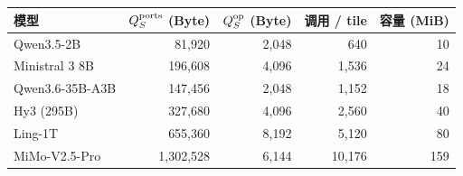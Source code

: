 \begin{tabular}{@{}lrrrr@{}}\toprule
模型 & $Q_S^{\rm ports}$ (Byte) & $Q_S^{\rm op}$ (Byte) & 调用 / tile & 容量 (MiB)\\\midrule
Qwen3.5-2B & 81,920 & 2,048 & 640 & 10\\
Ministral 3 8B & 196,608 & 4,096 & 1,536 & 24\\
Qwen3.6-35B-A3B & 147,456 & 2,048 & 1,152 & 18\\
Hy3 (295B) & 327,680 & 4,096 & 2,560 & 40\\
Ling-1T & 655,360 & 8,192 & 5,120 & 80\\
MiMo-V2.5-Pro & 1,302,528 & 6,144 & 10,176 & 159\\
\bottomrule\end{tabular}
